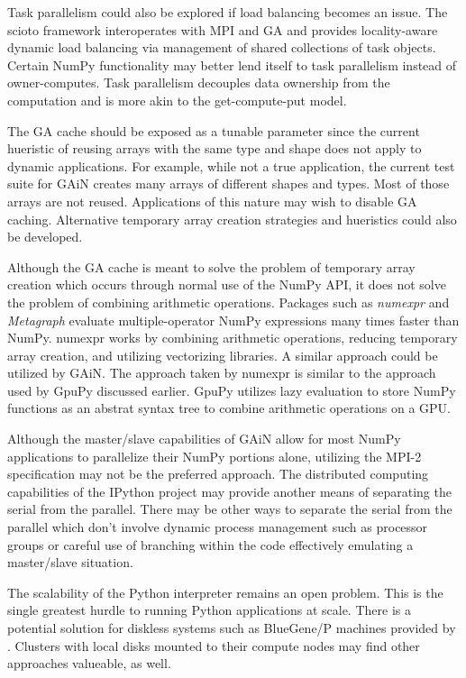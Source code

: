 \documentclass{sigplanconf}
\begin{document}
Task parallelism could also be explored if load balancing becomes an issue.
The scioto framework \cite{Din08} interoperates with MPI and GA and provides
locality-aware dynamic load balancing via management of shared collections of
task objects. Certain NumPy functionality may better lend itself to task
parallelism instead of owner-computes. Task parallelism decouples data
ownership from the computation and is more akin to the get-compute-put model.

The GA cache should be exposed as a tunable parameter since the current
hueristic of reusing arrays with the same type and shape does not apply to
dynamic applications. For example, while not a true application, the current
test suite for GAiN creates many arrays of different shapes and types. Most of
those arrays are not reused. Applications of this nature may wish to disable
GA caching.  Alternative temporary array creation strategies and hueristics
could also be developed.

Although the GA cache is meant to solve the problem of temporary array
creation which occurs through normal use of the NumPy API,  it does not solve
the problem of combining arithmetic operations. Packages such as
\emph{numexpr} \cite{Coo11} and \emph{Metagraph} \cite{Wan11} evaluate
multiple-operator NumPy expressions many times faster than NumPy. numexpr
works by combining arithmetic operations, reducing temporary array creation,
and utilizing vectorizing libraries. A similar approach could be utilized by
GAiN. The approach taken by numexpr is similar to the approach used by GpuPy
discussed earlier. GpuPy utilizes lazy evaluation to store NumPy functions as
an abstrat syntax tree to combine arithmetic operations on a GPU.

Although the master/slave capabilities of GAiN allow for most NumPy
applications to parallelize their NumPy portions alone, utilizing the MPI-2
specification may not be the preferred approach. The distributed computing
capabilities of the IPython project may provide another means of separating
the serial from the parallel. There may be other ways to separate the serial
from the parallel which don't involve dynamic process management such as
processor groups or careful use of branching within the code effectively
emulating a master/slave situation.

The scalability of the Python interpreter remains an open problem. This is the
single greatest hurdle to running Python applications at scale. There is a
potential solution for diskless systems such as BlueGene/P machines provided
by \cite{Scu11}. Clusters with local disks mounted to their compute nodes may
find other approaches valueable, as well.
\end{document}
